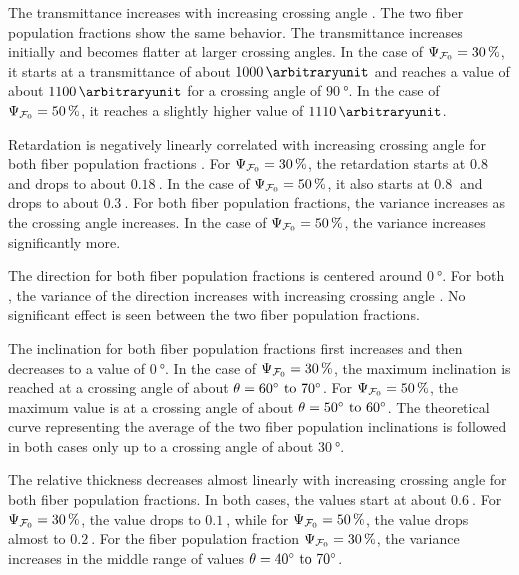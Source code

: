 \par
The transmittance increases with increasing crossing angle \modelOmega{}.
The two fiber population fractions \modelPsi{} show the same behavior.
The transmittance increases initially and becomes flatter at larger crossing angles.
In the case of $\textnormal{$\Psi_{\textnormal{$\mathcal{F}_0$}}$} = \SI{30}{\percent}$, it starts at a transmittance of about $\SI{1000}{\arbitraryunit}$ and reaches a value of about $\SI{1100}{\arbitraryunit}$ for a crossing angle of $\SI{90}{\degree}$.
In the case of $\textnormal{$\Psi_{\textnormal{$\mathcal{F}_0$}}$} = \SI{50}{\percent}$, it reaches a slightly higher value of $\SI{1110}{\arbitraryunit}$.
\par
Retardation is negatively linearly correlated with increasing crossing angle for both fiber population fractions \modelPsi{}.
For $\textnormal{$\Psi_{\textnormal{$\mathcal{F}_0$}}$}=\SI{30}{\percent}$, the retardation starts at $\SI{0.8}{}$ and drops to about $\SI{0.18}{}$.
In the case of $\textnormal{$\Psi_{\textnormal{$\mathcal{F}_0$}}$}=\SI{50}{\percent}$, it also starts at $\SI{0.8}{}$ and drops to about $\SI{0.3}{}$.
For both fiber population fractions, the variance increases as the crossing angle increases.
In the case of $\textnormal{$\Psi_{\textnormal{$\mathcal{F}_0$}}$}=\SI{50}{\percent}$, the variance increases significantly more.
\par
The direction for both fiber population fractions \modelPsi{} is centered around $\SI{0}{\degree}$.
For both \modelPsi{}, the variance of the direction increases with increasing crossing angle \modelOmega{}.
No significant effect is seen between the two fiber population fractions.
\par
The inclination for both fiber population fractions first increases and then decreases to a value of $\SI{0}{\degree}$.
In the case of $\textnormal{$\Psi_{\textnormal{$\mathcal{F}_0$}}$}=\SI{30}{\percent}$, the maximum inclination is reached at a crossing angle of about $\modelOmega=\SIrange{60}{70}{\degree}$.
For $\textnormal{$\Psi_{\textnormal{$\mathcal{F}_0$}}$}=\SI{50}{\percent}$, the maximum value is at a crossing angle of about $\modelOmega=\SIrange{50}{60}{\degree}$.
The theoretical curve representing the average of the two fiber population inclinations is followed in both cases only up to a crossing angle of about $\SI{30}{\degree}$.
\par
The relative thickness \trel{} decreases almost linearly with increasing crossing angle \modelOmega{} for both fiber population fractions.
In both cases, the \trel{} values start at about $\SI{0.6}{}$.
For $\textnormal{$\Psi_{\textnormal{$\mathcal{F}_0$}}$} = \SI{30}{\percent}$, the \trel{} value drops to $\SI{0.1}{}$, while for $\textnormal{$\Psi_{\textnormal{$\mathcal{F}_0$}}$} = \SI{50}{\percent}$, the \trel{} value drops almost to $\SI{0.2}{}$.
For the fiber population fraction $\textnormal{$\Psi_{\textnormal{$\mathcal{F}_0$}}$} = \SI{30}{\percent}$, the variance increases in the middle range of values $\modelOmega=\SIrange{40}{70}{\degree}$.

